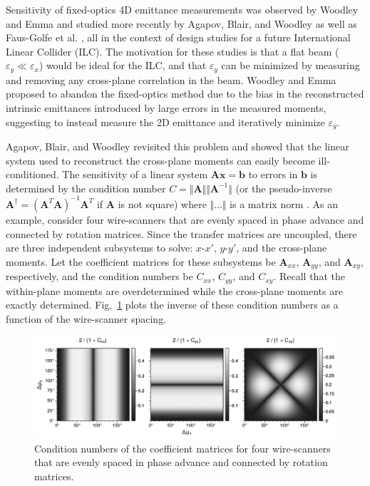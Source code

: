 Sensitivity of fixed-optics 4D emittance measurements was observed by Woodley and Emma \cite{Woodley2000} and studied more recently by Agapov, Blair, and Woodley \cite{Agapov2007} as well as Faus-Golfe et al. \cite{Faus-Golfe2016}, all in the context of design studies for a future International Linear Collider (ILC). The motivation for these studies is that a flat beam ($\varepsilon_y \ll \varepsilon_x$) would be ideal for the ILC, and that $\varepsilon_y$ can be minimized by measuring and removing any cross-plane correlation in the beam. Woodley and Emma proposed to abandon the fixed-optics method due to the bias in the reconstructed intrinsic emittances introduced by large errors in the measured moments, suggesting to instead measure the 2D emittance and iteratively minimize $\varepsilon_y$. 

Agapov, Blair, and Woodley revisited this problem and showed that the linear system used to reconstruct the cross-plane moments can easily become ill-conditioned. The sensitivity of a linear system $\mathbf{A} \mathbf{x} = \mathbf{b}$ to errors in $\mathbf{b}$ is determined by the condition number $C = \Vert \mathbf{A} \Vert \Vert \mathbf{A}^{-1} \Vert$ (or the pseudo-inverse $\mathbf{A}^\dagger = (\mathbf{A}^T\mathbf{A})^{-1} \mathbf{A}^T$ if $\mathbf{A}$ is not square) where $\Vert \dots \Vert$ is a matrix norm \cite{Golub1985}. As an example, consider four wire-scanners that are evenly spaced in phase advance and connected by rotation matrices. Since the transfer matrices are uncoupled, there are three independent subsystems to solve: $x$-$x'$, $y$-$y'$, and the cross-plane moments. Let the coefficient matrices for these subsystems be $\mathbf{A}_{xx}$, $\mathbf{A}_{yy}$, and $\mathbf{A}_{xy}$, respectively, and the condition numbers be $C_{xx}$, $C_{yy}$, and $C_{xy}$. Recall that the within-plane moments are overdetermined while the cross-plane moments are exactly determined. Fig.~\ref{fig:fodo_condition_number} plots the inverse of these condition numbers as a function of the wire-scanner spacing.
%
\begin{figure}[!p]
    \centering
    \vspace*{2cm}
    \includegraphics[width=\textwidth]{Images/chapter4/fodo_condition_number.pdf}
    \caption{Condition numbers of the coefficient matrices for four wire-scanners that are evenly spaced in phase advance and connected by rotation matrices.}
    \label{fig:fodo_condition_number}
    \vspace*{2cm}
\end{figure}
